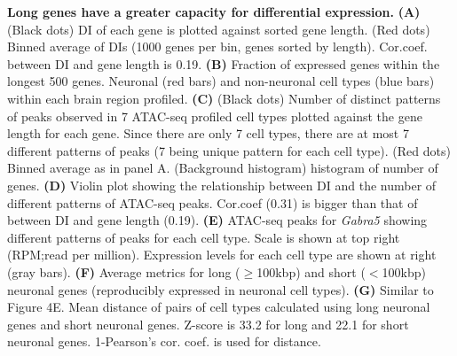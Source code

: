 \textbf{Long genes have a greater capacity for differential expression.}
\textbf{(A)} (Black dots) DI of each gene is plotted against sorted gene length. (Red dots) Binned average of DIs (1000 genes per bin, genes sorted by length). Cor.coef. between DI and gene length is 0.19. 
\textbf{(B)} Fraction of expressed genes within the longest 500 genes. Neuronal (red bars) and non-neuronal cell types (blue bars) within each brain region profiled.
\textbf{(C)} (Black dots) Number of distinct patterns of peaks observed in 7 ATAC-seq profiled cell types plotted against the gene length for each gene. Since there are only 7 cell types, there are at most 7 different patterns of peaks (7 being unique pattern for each cell type). (Red dots) Binned average as in panel A. (Background histogram) histogram of number of genes. 
\textbf{(D)} Violin plot showing the relationship between DI and the number of different patterns of ATAC-seq peaks. Cor.coef (0.31) is bigger than that of between DI and gene length (0.19).
\textbf{(E)} ATAC-seq peaks for \textit{Gabra5} showing different patterns of peaks for each cell type. Scale is shown at top right (RPM;read per million).  Expression levels for each cell type are shown at right (gray bars).
\textbf{(F)} Average metrics for long ($\geq$100kbp) and short ($<$100kbp) neuronal genes (reproducibly expressed in neuronal cell types). 
\textbf{(G)} Similar to Figure 4E. Mean distance of pairs of cell types calculated using long neuronal genes and short neuronal genes. Z-score is 33.2 for long and 22.1 for short neuronal genes. 1-Pearson's cor. coef. is used for distance.
